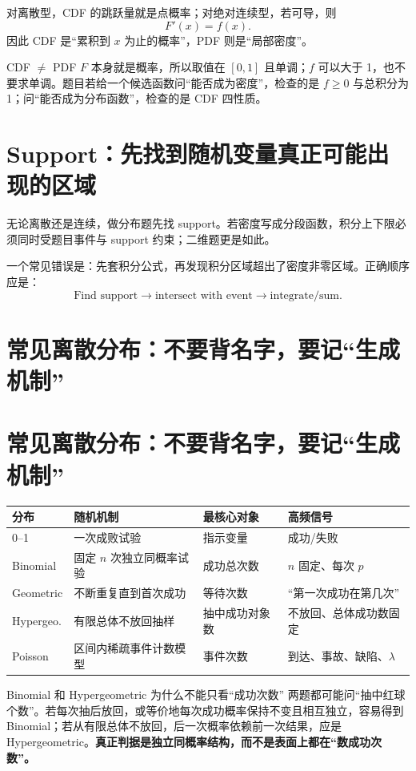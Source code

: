 \documentclass[11pt,a4paper,openany]{ctexbook}
\newcommand{\key}[1]{\textbf{\color{deep}#1}}
\begin{document}
对离散型，CDF 的跳跃量就是点概率；对绝对连续型，若可导，则
\[
F'(x)=f(x).
\]
因此 CDF 是“累积到 $x$ 为止的概率”，PDF 则是“局部密度”。

\begin{boundarybox}{CDF $\neq$ PDF}
$F$ 本身就是概率，所以取值在 $[0,1]$ 且单调；$f$ 可以大于 1，也不要求单调。题目若给一个候选函数问“能否成为密度”，检查的是 $f\ge0$ 与总积分为 1；问“能否成为分布函数”，检查的是 CDF 四性质。
\end{boundarybox}

\section{Support：先找到随机变量真正可能出现的区域}
无论离散还是连续，做分布题先找 support。若密度写成分段函数，积分上下限必须同时受题目事件与 support 约束；二维题更是如此。

一个常见错误是：先套积分公式，再发现积分区域超出了密度非零区域。正确顺序应是：
\[
\boxed{\text{Find support}\to\text{intersect with event}\to\text{integrate/sum}.}
\]

\section{常见离散分布：不要背名字，要记“生成机制”}
\section{常见离散分布：不要背名字，要记“生成机制”}
\begin{longtable}{L{2.6cm}L{4.6cm}L{4.0cm}L{\dimexpr\linewidth-12.17cm\relax}}
\toprule
\textbf{分布} & \textbf{随机机制} & \textbf{最核心对象} & \textbf{高频信号}\\
--1 & 一次成败试验 & 指示变量 & 成功/失败\\
Binomial & 固定 $n$ 次独立同概率试验 & 成功总次数 & $n$ 固定、每次 $p$\\
Geometric & 不断重复直到首次成功 & 等待次数 & “第一次成功在第几次”\\
Hypergeo. & 有限总体不放回抽样 & 抽中成功对象数 & 不放回、总体成功数固定\\
Poisson & 区间内稀疏事件计数模型 & 事件次数 & 到达、事故、缺陷、$\lambda$\\
\bottomrule
\end{longtable}

\begin{examplebox}{Binomial 和 Hypergeometric 为什么不能只看“成功次数”}
两题都可能问“抽中红球个数”。若每次抽后放回，或等价地每次成功概率保持不变且相互独立，容易得到 Binomial；若从有限总体不放回，后一次概率依赖前一次结果，应是 Hypergeometric。\key{真正判据是独立同概率结构，而不是表面上都在“数成功次数”。}
\end{examplebox}
\end{document}
